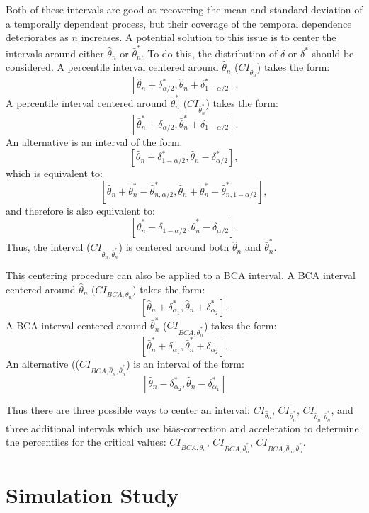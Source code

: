 \documentclass[12pt, letterpaper, titlepage]{article}
\begin{document}
	Both of these intervals are good at recovering the mean and standard deviation of a temporally dependent process, but their coverage of the temporal dependence deteriorates as $n$ increases. A potential solution to this issue is to center the intervals around either $\hat{\theta}_{n}$ or $\bar\theta_n^*$. To do this, the distribution of $\delta$ or $\delta^*$ should be considered. A percentile interval centered around $\hat{\theta}_{n}$ ($CI_{\hat{\theta}_{n}}$) takes the form:
\[ [\hat{\theta}_{n} + \delta^*_{\alpha/2}, \hat{\theta}_{n} + \delta^*_{1 - \alpha/2}].\] 
A percentile interval centered around $\bar\theta_n^*$ ($CI_{\bar\theta_n^*}$) takes the form: 
\[ [\bar\theta_n^* + \delta_{\alpha/2}, \bar\theta_n^* + \delta_{1 - \alpha/2}].\]
An alternative is an interval of the form:
\[ [\hat{\theta}_{n} - \delta^*_{1 - \alpha/2}, \hat{\theta}_{n} - \delta^*_{\alpha/2}],\] 
which is equivalent to:
\[ [\hat{\theta}_{n} + \bar\theta_n^*- \hat\theta_{n, \alpha/2}^*, \hat{\theta}_{n} + \bar\theta_n^* - \hat\theta_{n, 1 - \alpha/2}^*],\] 
and therefore is also equivalent to:
\[ [\bar\theta_n^* - \delta_{1 - \alpha/2}, \bar\theta_n^*- \delta_{\alpha/2}].\] 
Thus, the interval ($CI_{\hat{\theta}_{n}, \bar\theta_n^*}$) is centered around both $\hat{\theta}_{n}$ and $\bar\theta_n^*$.

This centering procedure can also be applied to a BCA interval. A BCA interval centered around $\hat{\theta}_{n}$ ($CI_{BCA, \hat{\theta}_{n}}$) takes the form:
\[ [\hat{\theta}_{n} + \delta^*_{\alpha_1}, \hat{\theta}_{n} + \delta^*_{\alpha_2}].\] 
A BCA interval centered around $\bar\theta_n^*$ ($CI_{BCA, \bar\theta_n^*}$) takes the form: 
\[ [\bar\theta_n^* + \delta_{\alpha_1}, \bar\theta_n^* + \delta_{\alpha_2}].\]
An alternative (($CI_{BCA, \hat{\theta}_{n}, \bar\theta_n^*}$) is an interval of the form:
\[ [\hat{\theta}_{n} - \delta^*_{\alpha_2}, \hat{\theta}_{n} - \delta^*_{\alpha_1}]\] 

Thus there are three possible ways to center an interval: $CI_{\hat{\theta}_{n}}$, $CI_{\bar\theta_n^*}$, $CI_{\hat{\theta}_{n}, \bar\theta_n^*}$, and three additional intervals which use bias-correction and acceleration to determine the percentiles for the critical values: $CI_{BCA, \hat{\theta}_{n}}$, $CI_{BCA, \bar\theta_n^*}$, $CI_{BCA, \hat{\theta}_{n}, \bar\theta_n^*}$.


\section{Simulation Study}
\label{sec:simstudy}
\end{document}
